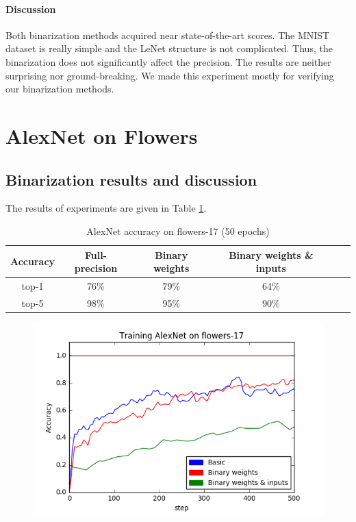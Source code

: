 \documentclass[licencjacka]{pracamgr}
\begin{document}
		        \paragraph{Discussion} 
			Both binarization methods acquired near state-of-the-art scores. The MNIST dataset is really simple and the LeNet structure is not complicated. Thus, the binarization does not significantly affect the precision. The results are neither surprising nor ground-breaking. We made this experiment mostly for verifying our binarization methods.
	\section{AlexNet on Flowers}
		\subsection{Binarization results and discussion}
		        The results of experiments are given in Table \ref{table:2}.
		        \begin{table}[H]
				\caption{AlexNet accuracy on flowers-17 (50 epochs)}
                    \centering
                    \begin{tabular}{c c c c c c}
                    \hline\hline
			    Accuracy & Full-precision & Binary weights & Binary weights \& inputs \\ [0.5ex]
                    \hline
			    top-1 & 76\% & 79\% & 64\% \\
                    \hline
			    top-5 & 98\% & 95\% & 90\% \\
                    \hline
                    \end{tabular}
                    \label{table:2}
	            \end{table}
	            \begin{figure}[h]
				\centering
				\includegraphics[width=\textwidth]{images/AlexNet-flowers17}
			\end{figure}
	            
\end{document}
